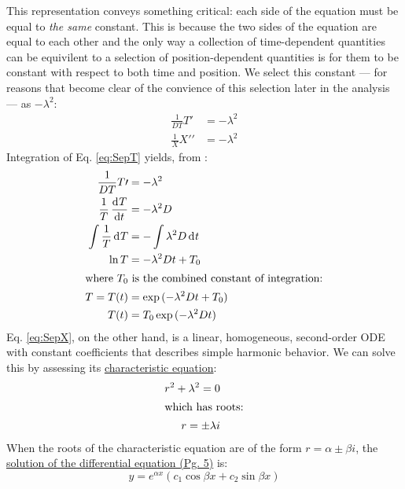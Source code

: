 This representation conveys something critical: each side of the equation must be equal to \emph{the same} constant. This is because the two sides of the equation are equal to each other and the only way a collection of time-dependent quantities can be equivilent to a selection of position-dependent quantities is for them to be constant with respect to both time and position. We select this constant --- for reasons that become clear of the convience of this selection later in the analysis --- as $-\lambda^2$: %
%
\begin{subequations}
	\begin{align}
		\frac{1}{DT}T\prime &= -\lambda^2 \label{eq:SepT}\\
		\frac{1}{X}X\prime\prime &= -\lambda^2 \label{eq:SepX}
	\end{align}  
\end{subequations}	
%
Integration of Eq. \ref{eq:SepT} yields, from :
%
\begin{align}
	\frac{1}{DT}T\prime &= -\lambda^2 \nonumber\\
	\frac{1}{T}\mathop{}\!\frac{\mathrm{d}^{}{T}}{\mathrm{d}{t}^{}} &= -\lambda^2 D \nonumber\\
	\int \frac{1}{T}\mathop{}\!\mathrm{d^{}}{T} &= -\int \lambda^2 D \mathop{}\!\mathrm{d^{}}{t} \nonumber\\
	\ln{T} &= -\lambda^2 D t + T_0 \nonumber\\
	\intertext{where $T_0$ is the combined constant of integration:}
	T = T(t) &= \exp{(-\lambda^2 D t + T_0)} \nonumber\\
	T(t) &= T_0 \exp{(-\lambda^2 D t)} \label{eq:Tt}
\end{align}
%
Eq. \ref{eq:SepX}, on the other hand, is a linear, homogeneous, second-order ODE with constant coefficients that describes simple harmonic behavior. We can solve this by assessing its \href{https://en.wikipedia.org/wiki/Characteristic_equation_(calculus)}{characteristic equation}:
\begin{align}
	r^2+\lambda^2 = 0\\
	\intertext{which has roots:}
	r = \pm \lambda i
\end{align}
When the roots of the characteristic equation are of the form $r = \alpha \pm \beta i$, the \href{http://www.stewartcalculus.com/data/CALCULUS\%20Concepts\%20and\%20Contexts/upfiles/3c3-2ndOrderLinearEqns_Stu.pdf}{solution of the differential equation (Pg. 5)} is:
\begin{equation}
		y = e^{\alpha x}(c_1 \cos{\beta x} + c_2 \sin{\beta x})
\end{equation}

